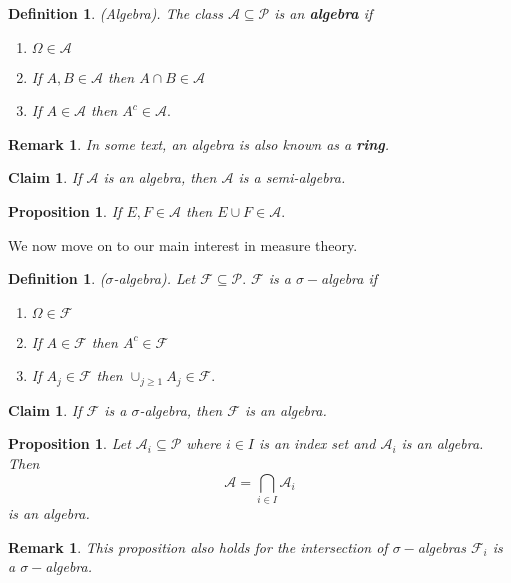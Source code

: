\documentclass[twoside]{article}
\newtheorem{proposition}[theorem]{Proposition}
\newtheorem{claim}[theorem]{Claim}
\newtheorem{definition}[theorem]{Definition}
\newtheorem{remark}[theorem]{Remark}
\begin{document}
\begin{definition}(Algebra). The class $\mathcal{A} \subseteq \mathcal{P}$ is an \textbf{algebra} if 
\begin{enumerate}
\item $\Omega \in \mathcal{A}$
\item If $A,B \in \mathcal{A}$ then $A \cap B \in \mathcal{A}$
\item If $A \in \mathcal{A}$ then $A^c \in \mathcal{A}.$
\end{enumerate}
\end{definition}

\begin{remark}In some text, an algebra is also known as a \textbf{ring}.
\end{remark}

\begin{claim}If $\mathcal{A}$ is an algebra, then $\mathcal{A}$ is a semi-algebra.
\end{claim}

\begin{proposition}If $E,F \in \mathcal{A}$ then $E \cup F \in \mathcal{A}.$
\end{proposition}

We now move on to our main interest in measure theory.

\begin{definition}($\sigma$-algebra). Let $\mathcal{F} \subseteq \mathcal{P}.$ $\mathcal{F}$ is a $\sigma-$algebra if 
\begin{enumerate}
\item $\Omega \in \mathcal{F}$
\item If $A \in \mathcal{F}$ then $A^c \in \mathcal{F}$
\item If $A_j \in \mathcal{F}$ then $\cup_{j \geq 1}A_j \in \mathcal{F}.$
\end{enumerate}
\end{definition}


\begin{claim}If $\mathcal{F}$ is a $\sigma$-algebra, then $\mathcal{F}$ is an algebra.
\end{claim}

\begin{proposition}Let $\mathcal{A}_i \subseteq \mathcal{P}$ where $i \in I$ is an index set and $\mathcal{A}_i$ is an algebra. Then 
$$
\mathcal{A} = \bigcap_{i \in I}\mathcal{A}_i
$$
is an algebra.
\end{proposition}

\begin{remark}This proposition also holds for the intersection of $\sigma-$algebras $\mathcal{F}_i$ is a $\sigma-$algebra.
\end{remark}
\end{document}
